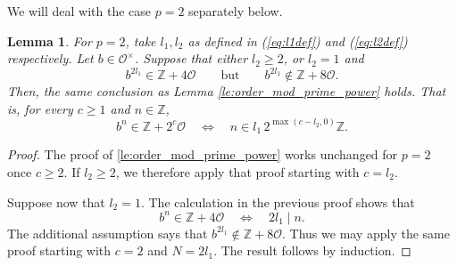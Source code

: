\documentclass[11pt,letterpaper]{amsart}
\newtheorem{lem}[theorem]{Lemma}
\theoremstyle{definition}
\theoremstyle{remark}
\newcommand{\cal}[1]{\mathcal{#1}}
\newcommand{\bb}[1]{\mathbb{#1}}
\newcommand{\Z}{\bb Z}
\newcommand{\calO}{\cal O}
\begin{document}
	We will deal with the case $p=2$ separately below.
\begin{lem}
\label{le:order_mod_prime_powertwo}
For $p=2$, take $l_{1},l_{2}$ as defined in (\ref{eq:l1def}) and (\ref{eq:l2def}) respectively.
Let $b \in \mathcal{O}^{\times}$.
Suppose that either $l_2\geq 2$,
or $l_2=1$ and
\[
b^{2l_1}\in\mathbb Z+4\calO
\qquad\text{but}\qquad
b^{2l_1}\notin\mathbb Z+8\calO.
\]
Then, the same conclusion as Lemma \ref{le:order_mod_prime_power} holds. That is, for every $c\geq1$ and $n\in\mathbb Z$,
  \[
  b^n\in\mathbb Z+2^c\calO
  \quad\Longleftrightarrow\quad
  n\in l_1\,2^{\max(c-l_2,0)}\mathbb Z.
  \]

\end{lem}
  \begin{proof}
	    The proof of \cref{le:order_mod_prime_power} works unchanged for $p=2$
  once $c\geq2$. If $l_2\geq2$, we therefore apply that proof starting
  with $c=l_2$.

  Suppose now that $l_2=1$. The calculation in the previous proof shows
  that
  \[
  b^n\in\Z+4\calO \quad\Longleftrightarrow\quad 2l_1\mid n.
  \]
  The additional assumption says that $b^{2l_1}\notin\Z+8\calO$.
  Thus we may apply the same proof starting with $c=2$ and $N=2l_1$.
  The result follows by induction.
  \end{proof}
\end{document}
